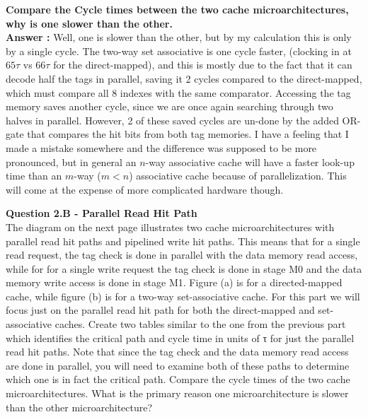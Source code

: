 \documentclass[a4paper,11pt]{article}
\newcommand{\answer}{\textbf{Answer : }}
\begin{document}
\textbf{Compare the Cycle times between the two cache microarchitectures, why is one slower than the other.} \\
\answer Well, one is slower than the other, but by my calculation this is only by a single cycle. The two-way set associative is one cycle faster, (clocking in at $65\tau$ vs $66\tau$ for the direct-mapped), and this is mostly due to the fact that it can decode half the tags in parallel, saving it 2 cycles compared to the direct-mapped, which must compare all 8 indexes with the same comparator. Accessing the tag memory saves another cycle, since we are once again searching through two halves in parallel. However, 2 of these saved cycles are un-done by the added OR-gate that compares the hit bits from both tag memories. I have a feeling that I made a mistake somewhere and the difference was supposed to be more pronounced, but in general an $n$-way associative cache will have a faster look-up time than an $m$-way ($m < n$) associative cache because of parallelization. This will come at the expense of more complicated hardware though. \\


\item \textbf{Question 2.B - Parallel Read Hit Path} \\ 

The diagram on the next page illustrates two cache microarchitectures with parallel read hit paths and pipelined write hit paths. This means that for a single read request, the tag check is done in parallel with the data memory read access, while for for a single write request the tag check is done in stage M0 and the data memory write access is done in stage M1. Figure (a) is for a directed-mapped cache, while figure (b) is for a two-way set-associative cache. For this part we will focus just on the parallel read hit path for both the direct-mapped and set-associative caches. Create two tables similar to the one from the previous part which identifies the critical path and cycle time in units of τ for just the parallel read hit paths. Note that since the tag check and the data memory read access are done in parallel, you will need to examine both of these paths to determine which one is in fact the critical path. Compare the cycle times of the two cache microarchitectures. What is the primary reason one microarchitecture is slower than the other microarchitecture? \\
\end{document}
